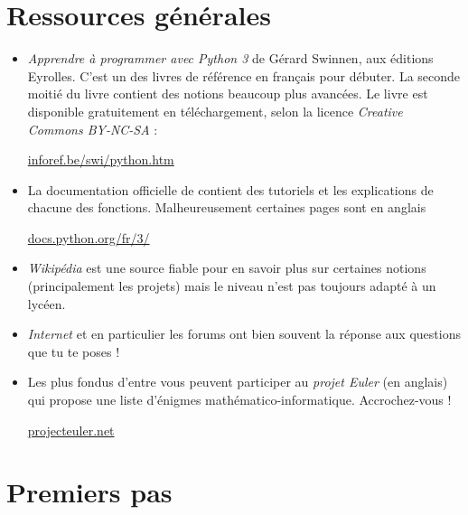 \documentclass[11pt,class=report,crop=false]{standalone}
\begin{document}


\section*{Ressources générales}

\begin{itemize}
  \item \emph{Apprendre à programmer avec Python 3} de Gérard Swinnen, aux éditions Eyrolles.
   C'est un des livres de référence en français pour débuter. La seconde moitié du livre contient des notions beaucoup plus avancées. 
  Le livre est disponible gratuitement en téléchargement, selon la licence \emph{Creative Commons BY-NC-SA} :
  
  \centerline{
  \href{https://inforef.be/swi/python.htm}{inforef.be/swi/python.htm}
}

  \item La documentation officielle de \Python{} contient des tutoriels et les explications de chacune des fonctions. Malheureusement certaines pages sont en anglais
  
  \centerline{
\href{https://docs.python.org/fr/3/}{docs.python.org/fr/3/}
}  

  \item \emph{Wikipédia} est une source fiable pour en savoir plus sur certaines notions (principalement les projets) mais le niveau n'est pas toujours adapté à un lycéen.
  
  \item \emph{Internet} et en particulier les forums ont bien souvent la réponse aux questions que tu te poses ! 
  
  \item Les plus fondus d'entre vous peuvent participer au \emph{projet Euler} (en anglais) qui propose une liste d'énigmes mathématico-informatique. Accrochez-vous !
  
  \centerline{
  \href{https://projecteuler.net/}{projecteuler.net}
}  

\end{itemize}


\section{Premiers pas}
\end{document}

